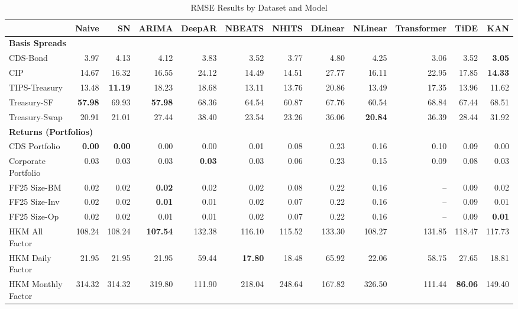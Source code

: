 
\begin{table}[htbp]
\centering
\caption{RMSE Results by Dataset and Model}
\label{tab:rmse_results}
\scriptsize
\setlength{\tabcolsep}{1.5pt}
\renewcommand{\arraystretch}{0.9}
\begin{tabular}{@{}lrrrrrrrrrrr@{}}
\toprule
 & Naive & SN & ARIMA & DeepAR & NBEATS & NHITS & DLinear & NLinear & Transformer & TiDE & KAN \\
\midrule
\multicolumn{12}{l}{\textbf{Basis Spreads}} \\
CDS-Bond & 3.97 & 4.13 & 4.12 & 3.83 & 3.52 & 3.77 & 4.80 & 4.25 & 3.06 & 3.52 & \textbf{3.05} \\
CIP & 14.67 & 16.32 & 16.55 & 24.12 & 14.49 & 14.51 & 27.77 & 16.11 & 22.95 & 17.85 & \textbf{14.33} \\
TIPS-Treasury & 13.48 & \textbf{11.19} & 18.23 & 18.68 & 13.11 & 13.76 & 20.86 & 13.49 & 17.35 & 13.96 & 11.62 \\
Treasury-SF & \textbf{57.98} & 69.93 & \textbf{57.98} & 68.36 & 64.54 & 60.87 & 67.76 & 60.54 & 68.84 & 67.44 & 68.51 \\
Treasury-Swap & 20.91 & 21.01 & 27.44 & 38.40 & 23.54 & 23.26 & 36.06 & \textbf{20.84} & 36.39 & 28.44 & 31.92 \\
\midrule
\multicolumn{12}{l}{\textbf{Returns (Portfolios)}} \\
CDS Portfolio & \textbf{0.00} & \textbf{0.00} & 0.00 & 0.00 & 0.01 & 0.08 & 0.23 & 0.16 & 0.10 & 0.09 & 0.00 \\
Corporate Portfolio & 0.03 & 0.03 & 0.03 & \textbf{0.03} & 0.03 & 0.06 & 0.23 & 0.15 & 0.09 & 0.08 & 0.03 \\
FF25 Size-BM & 0.02 & 0.02 & \textbf{0.02} & 0.02 & 0.02 & 0.08 & 0.22 & 0.16 & -- & 0.09 & 0.02 \\
FF25 Size-Inv & 0.02 & 0.02 & \textbf{0.01} & 0.01 & 0.02 & 0.07 & 0.22 & 0.16 & -- & 0.09 & 0.01 \\
FF25 Size-Op & 0.02 & 0.02 & 0.01 & 0.01 & 0.02 & 0.07 & 0.22 & 0.16 & -- & 0.09 & \textbf{0.01} \\
HKM All Factor & 108.24 & 108.24 & \textbf{107.54} & 132.38 & 116.10 & 115.52 & 133.30 & 108.27 & 131.85 & 118.47 & 117.73 \\
HKM Daily Factor & 21.95 & 21.95 & 21.95 & 59.44 & \textbf{17.80} & 18.48 & 65.92 & 22.06 & 58.75 & 27.65 & 18.81 \\
HKM Monthly Factor & 314.32 & 314.32 & 319.80 & 111.90 & 218.04 & 248.64 & 167.82 & 326.50 & 111.44 & \textbf{86.06} & 149.40 \\

\end{tabular}
\end{table}

